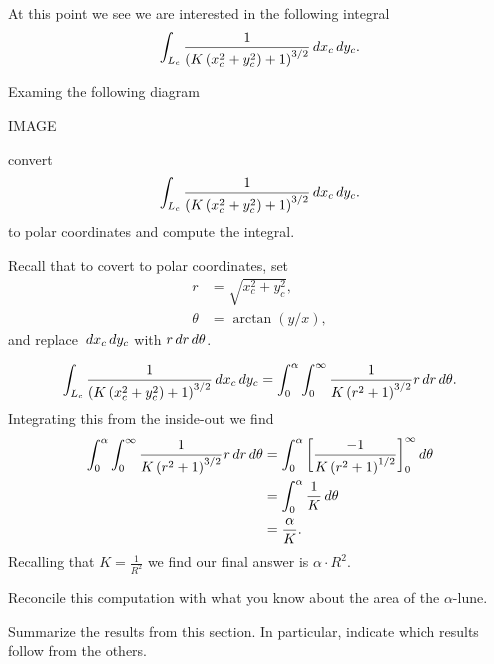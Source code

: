 \documentclass{ximera}
\begin{document}
At this point we see we are interested in the following integral
\[
\int_{L_c} \frac{1}{\left(K\left(x_c^2+y_c^2\right)+1\right)^{3/2}} \,d x_c\,d y_c.
\]

\begin{problem}
  Examing the following diagram
  \begin{image}
    IMAGE
  \end{image}
  convert
  \[
  \int_{L_c} \frac{1}{\left(K\left(x_c^2+y_c^2\right)+1\right)^{3/2}} \,d x_c\,d y_c.
  \]
  to polar coordinates and compute the integral.
  \begin{hint}
    Recall that to covert to polar coordinates, set
    \begin{align*}
      r &= \sqrt{x_c^2+y_c^2},\\
      \theta &= \arctan(y/x),
    \end{align*}
    and replace $\,d x_c\,d y_c$ with $r\,d r\,d \theta$.
  \end{hint}
  \begin{freeResponse}
    \[
    \int_{L_c}
    \frac{1}{\left(K\left(x_c^2+y_c^2\right)+1\right)^{3/2}} \,d x_c\,d
    y_c = \int_0^\alpha \int_0^\infty \frac{1}{K\left(r^2+1\right)^{3/2}} r\,d r \,d \theta.
    \]
    Integrating this from the inside-out we find
    \begin{align*}
      \int_0^\alpha \int_0^\infty \frac{1}{K\left(r^2+1\right)^{3/2}} r\,d r \,d \theta &= \int_0^\alpha \bigg[ \frac{-1}{K\left(r^2+1\right)^{1/2}} \bigg]_0^\infty \,d \theta\\
      &= \int_0^\alpha \frac{1}{K} \,d \theta\\
      &= \frac{\alpha}{K}.   
    \end{align*}
    Recalling that $K = \frac{1}{R^2}$ we find our final answer is $\alpha \cdot R^2$.
  \end{freeResponse}
\end{problem}

\begin{problem}
  Reconcile this computation with what you know about the area of the
  $\alpha$-lune.
\end{problem}

\begin{problem}
Summarize the results from this section. In particular, indicate which
results follow from the others.
\begin{freeResponse}
\end{freeResponse}
\end{problem}
\end{document}
